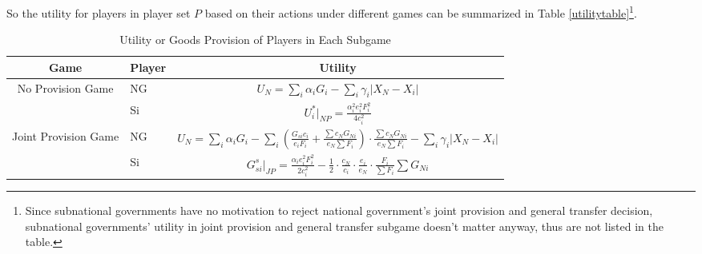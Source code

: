 \begin{itemize}
So the utility for players in player set $P$ based on their actions under different games can be summarized in Table \ref{utilitytable}\footnote{Since subnational governments have no motivation to reject national government's joint provision and general transfer decision, subnational governments' utility in joint provision and general transfer subgame doesn't matter anyway, thus are not listed in the table.}.
\begin{table}[htbp]
  \centering
  \caption{Utility or Goods Provision of Players in Each Subgame}
  \begin{tabular}{clc}
    \toprule
    \multicolumn{1}{p{11.645em}}{Game}                         & \multicolumn{1}{p{2.855em}}{Player}        & \multicolumn{1}{p{16.57em}}{Utility}                                                                                                                                       \\
    \midrule
    \multicolumn{1}{c}{\multirow{3}[4]{*}{No Provision Game }} & \multicolumn{1}{p{2.855em}}{NG}            & $U_N=\sum_i\alpha_i G_i-\sum_i \gamma_i |X_N-X_i|$                                                                                                                         \\
    \cmidrule{2-3}                                             & \multicolumn{1}{l}{\multirow{2}[2]{*}{Si}} & \multirow{2}[2]{*}{ $U_i^*|_{NP}=\frac{\alpha_i^2 e_i^2 F_i^2}{4c_i^2}$}                                                                                                   \\
                                                               &                                            &                                                                                                                                                                            \\
    \midrule
    \multirow{3}[4]{*}{Joint Provision Game}                   & \multicolumn{1}{p{2.855em}}{NG}            & $ U_N= \sum_i \alpha_i G_i - \sum_i (\frac{G_{si} c_{i}}{e_i F_i}+\frac{\sum c_N G_{Ni}}{e_N\sum F_i })\cdot \frac{\sum c_N G_{Ni}}{e_N\sum F_i }
    -\sum_i \gamma_i |X_N-X_i| $                                                                                                                                                                                                                                                         \\
    \cmidrule{2-3}                                             & \multicolumn{1}{l}{\multirow{2}[2]{*}{Si}} & \multirow{2}[2]{*}{$G_{si}^{s}|_{JP}=\frac{\alpha_ie_i^2F_i^2}{2c_i^2}-\frac{1}{2}\cdot\frac{c_N}{c_i}\cdot\frac{e_i}{e_N}\cdot\frac{F_i}{\sum F_i}\sum G_{Ni}$}           \\

\end{tabular}
\end{table}
\end{itemize}
